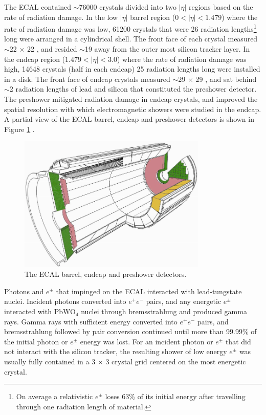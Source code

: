 The ECAL contained $\sim$76000 crystals divided into two $|\eta|$ regions based on the rate of radiation 
damage.  In the low $|\eta|$ barrel region ($0 < |\eta| < 1.479$) where the rate of radiation damage was low, 61200 
crystals that were 26 radiation lengths\footnote{On average a relativistic $e^{\pm}$ loses 63\% of its initial energy after 
travelling through one radiation length of material.} long were arranged in a cylindrical shell.  The front face of 
each crystal measured $\sim$22 $\times$ 22 \mm, and resided $\sim$19 \cm away from the outer most silicon tracker layer.  
In the endcap region ($1.479 < |\eta| < 3.0$) where the rate of radiation damage was high, 14648 crystals (half in each 
endcap) 25 radiation lengths long were installed in a disk.  The front face of endcap crystals measured $\sim$29 
$\times$ 29 \mm, and sat behind $\sim$2 radiation lengths of lead and silicon that constituted the preshower detector.  
The preshower mitigated radiation damage in endcap crystals, and improved the spatial resolution with 
which electromagnetic showers were studied in the endcap.  A partial view of the ECAL barrel, endcap and 
preshower detectors is shown in Figure \ref{fig:ecalEBEEandES} \cite{ecalTDR}.

\begin{figure}[ht]
	\centering
	\includegraphics[width=0.8\textwidth]{figures/ecalBarrelEndcapAndPreshower.png}
	\caption{The ECAL barrel, endcap and preshower detectors.}
	\label{fig:ecalEBEEandES}
\end{figure}


Photons and $e^{\pm}$ that impinged on the ECAL interacted with lead-tungstate nuclei.  Incident photons 
converted into $e^{+}e^{-}$ pairs, and any energetic $e^{\pm}$ interacted with PbWO$_{4}$ nuclei through 
bremsstrahlung and produced gamma rays.  Gamma rays with sufficient energy converted into $e^{+}e^{-}$ pairs, 
and bremsstrahlung followed by pair conversion continued until more than 99.99\% of the initial photon or 
$e^{\pm}$ energy was lost.  For an incident photon or $e^{\pm}$ that did not interact with the silicon 
tracker, the resulting shower of low energy $e^{\pm}$ was usually fully contained in a 3 $\times$ 3 crystal 
grid centered on the most energetic crystal.

